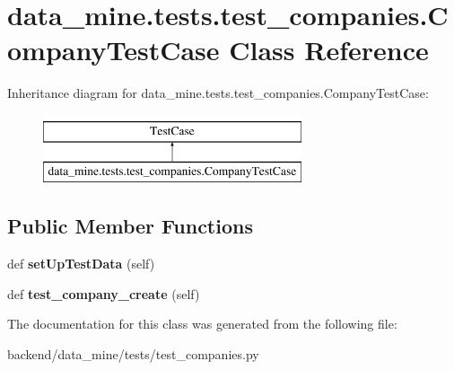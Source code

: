 \hypertarget{classdata__mine_1_1tests_1_1test__companies_1_1_company_test_case}{}\section{data\+\_\+mine.\+tests.\+test\+\_\+companies.\+Company\+Test\+Case Class Reference}
\label{classdata__mine_1_1tests_1_1test__companies_1_1_company_test_case}
Inheritance diagram for data\+\_\+mine.\+tests.\+test\+\_\+companies.\+Company\+Test\+Case\+:\begin{figure}[H]
\begin{center}
\leavevmode
\includegraphics[height=2.000000cm]{classdata__mine_1_1tests_1_1test__companies_1_1_company_test_case}
\end{center}
\end{figure}
\subsection*{Public Member Functions}
\begin{DoxyCompactItemize}
\item 
\mbox{\label{classdata__mine_1_1tests_1_1test__companies_1_1_company_test_case_a06558a63be4757213f6ec4ef91ee2f41}} 
def {\bfseries set\+Up\+Test\+Data} (self)
\item 
\mbox{\label{classdata__mine_1_1tests_1_1test__companies_1_1_company_test_case_a94a2ce9c364c871fdb57db80bf6fdca5}} 
def {\bfseries test\+\_\+company\+\_\+create} (self)
\end{DoxyCompactItemize}


The documentation for this class was generated from the following file\+:\begin{DoxyCompactItemize}
\item 
backend/data\+\_\+mine/tests/test\+\_\+companies.\+py\end{DoxyCompactItemize}
